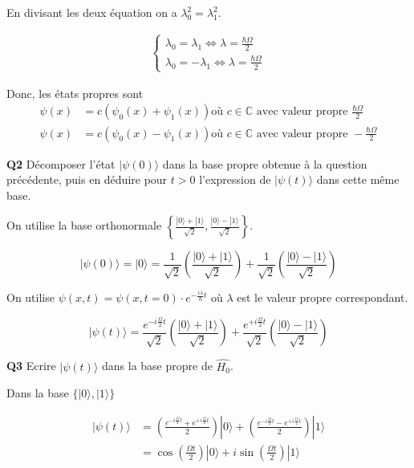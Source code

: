 \documentclass[french]{article}
\begin{document}
	En divisant les deux équation on a $\lambda_0^2 = \lambda_1^2$.
	
	\begin{align}
		\begin{cases}
		\lambda_0 = \lambda_1 \iff \lambda = \frac{\hbar \Omega}{2}\\
		\lambda_0 = -\lambda_1 \iff  \lambda = \frac{\hbar \Omega}{2}
		\end{cases}
	\end{align}
	
	Donc, les états propres sont 
	\begin{align}
		\psi(x) &= c(\psi_0(x) + \psi_1(x)) \text{où $c \in \mathbb{C}$ avec valeur propre } \frac{\hbar \Omega}{2}\\
		\psi(x) &= c(\psi_0(x) - \psi_1(x)) \text{où $c \in \mathbb{C}$ avec valeur propre } -\frac{\hbar \Omega}{2}
	\end{align}

	\begin{tcolorbox}[colback=gray!5!white,colframe=gray!75!black]
		\textbf{\large{Q2}} Décomposer l'état $|\psi(0)\rangle$ dans la base propre obtenue à la question précédente, puis en déduire pour $t > 0$ l'expression de $|\psi(t)\rangle$ dans cette même base.
	\end{tcolorbox}

	On utilise la base orthonormale $\left\{ \frac{|0\rangle + |1\rangle}{\sqrt{2}} ,\frac{|0\rangle - |1\rangle}{\sqrt{2}}  \right\}$.
	
	\[|\psi(0)\rangle = |0\rangle = \frac{1}{\sqrt{2}}\left(\frac{|0\rangle + |1\rangle}{\sqrt{2}}\right) + \frac{1}{\sqrt{2}}\left(\frac{|0\rangle - |1\rangle}{\sqrt{2}}\right) \]
	
	On utilise $\psi(x,t) = \psi(x,t=0) \cdot e^{-\frac{i\lambda}{\hbar}t}$ où $\lambda$ est le valeur propre correspondant.
	
	\[|\psi(t)\rangle = \frac{e^{-i \frac{\Omega}{2} t}}{\sqrt{2}}\left(\frac{|0\rangle + |1\rangle}{\sqrt{2}}\right) + \frac{e^{+i \frac{\Omega}{2} t}}{\sqrt{2}}\left(\frac{|0\rangle - |1\rangle}{\sqrt{2}}\right)\]

	\begin{tcolorbox}[colback=gray!5!white,colframe=gray!75!black]
		\textbf{\large{Q3}} Ecrire  $|\psi(t)\rangle$ dans la base propre de $\hat{H_0}$.
	\end{tcolorbox}

	Dans la base $\{ |0\rangle, |1\rangle\}$
	
	\begin{align}
	|\psi(t)\rangle &= \left(\frac{e^{-i \frac{\Omega}{2} t} +e^{+i \frac{\Omega}{2} t} }{2}\right) |0\rangle + \left(\frac{e^{-i \frac{\Omega}{2} t} - e^{+i \frac{\Omega}{2} t} }{2}\right) |1\rangle\\
	&= \cos\left(\frac{\Omega t}{2}\right)|0\rangle + i \sin\left(\frac{\Omega t}{2}\right)|1\rangle
	\end{align}
\end{document}
